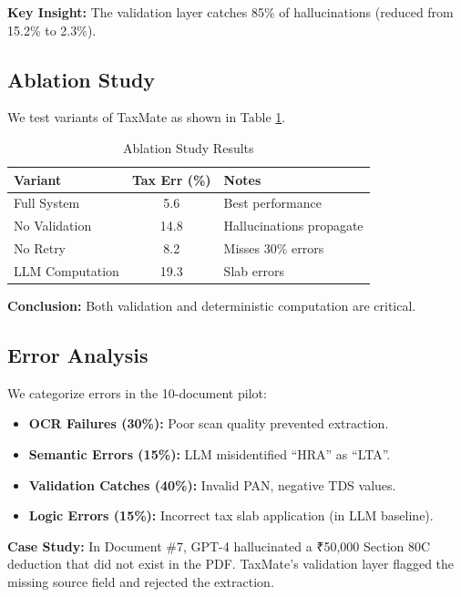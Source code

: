 \documentclass[conference]{IEEEtran}
\begin{document}
\textbf{Key Insight:} The validation layer catches 85\% of hallucinations (reduced from 15.2\% to 2.3\%).

\subsection{Ablation Study}

We test variants of TaxMate as shown in Table \ref{tab:ablation}.

\begin{table}[htbp]
\caption{Ablation Study Results}
\begin{center}
\begin{tabular}{|l|c|l|}
\hline
\textbf{Variant} & \textbf{Tax Err (\%)} & \textbf{Notes} \\
\hline
Full System & 5.6 & Best performance \\
No Validation & 14.8 & Hallucinations propagate \\
No Retry & 8.2 & Misses 30\% errors \\
LLM Computation & 19.3 & Slab errors \\
\hline
\end{tabular}
\label{tab:ablation}
\end{center}
\end{table}

\textbf{Conclusion:} Both validation and deterministic computation are critical.

\subsection{Error Analysis}

We categorize errors in the 10-document pilot:

\begin{itemize}
    \item \textbf{OCR Failures (30\%):} Poor scan quality prevented extraction.
    \item \textbf{Semantic Errors (15\%):} LLM misidentified ``HRA'' as ``LTA''.
    \item \textbf{Validation Catches (40\%):} Invalid PAN, negative TDS values.
    \item \textbf{Logic Errors (15\%):} Incorrect tax slab application (in LLM baseline).
\end{itemize}

\textbf{Case Study:} In Document \#7, GPT-4 hallucinated a ₹50,000 Section 80C deduction that did not exist in the PDF. TaxMate's validation layer flagged the missing source field and rejected the extraction.
\end{document}
